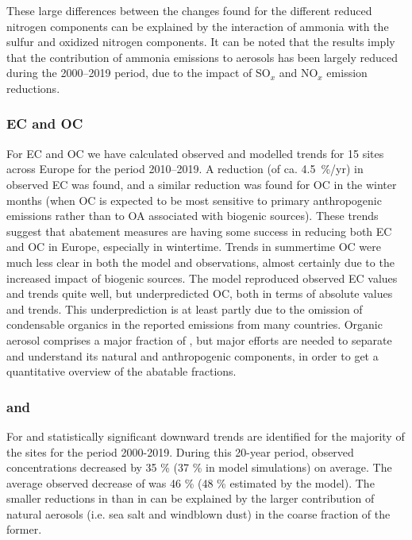 These large differences between the changes found for the different reduced nitrogen components can be explained by the interaction of ammonia with the sulfur and oxidized nitrogen components. It can be noted that the results imply that the contribution of ammonia emissions to aerosols has been largely reduced during the 2000--2019 period, due to the impact of SO$_x$ and NO$_x$ emission reductions. 




\subsubsection*{EC and OC}
For EC and OC we have calculated observed and modelled trends for 15 sites across Europe for the period 2010--2019. A reduction (of ca. 4.5~\%/yr) in observed EC was found, and a similar reduction was found for OC in the winter months (when OC is expected to be most sensitive to primary anthropogenic emissions rather than to OA associated with biogenic sources). These trends suggest that abatement measures are having some success in reducing both EC and OC in Europe, especially in wintertime. 
Trends in summertime OC were much less clear in both the model and observations, almost certainly due to the increased impact of biogenic sources.
The model reproduced observed EC values and trends quite well, but underpredicted OC, both in terms of absolute values and trends. This underprediction is at least partly due to the omission of condensable organics in the reported emissions from many countries. 
Organic aerosol comprises a major fraction of \pmfine, but major efforts are needed to separate and understand its natural and anthropogenic components, in order to get a quantitative overview of the abatable fractions.
%
\subsubsection*{\PM[10] and \PM[2.5]}
For \PM[10] and \PM[2.5] statistically significant downward trends are identified for the majority of the sites for the period 2000-2019.
During this 20-year period, observed \PM[10] concentrations decreased by 35 \%  (37 \% in model simulations) on average. 
The average observed decrease of \PM[2.5] was 46 \%  (48 \% estimated by the model). The smaller reductions in \PM[10] than in \PM[2.5] can be explained by the larger contribution of natural aerosols (i.e. sea salt and windblown dust) in the coarse fraction of the former. 

